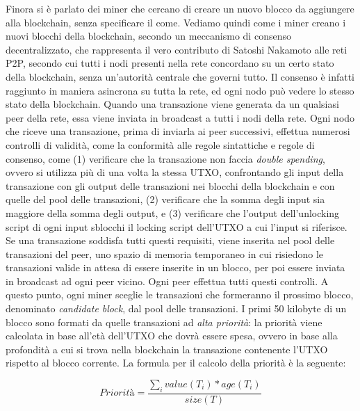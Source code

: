 Finora si è parlato dei miner che cercano di creare un nuovo blocco da aggiungere alla blockchain, senza specificare il come. Vediamo quindi come i miner creano i nuovi blocchi della blockchain, secondo un meccanismo di consenso decentralizzato, che rappresenta il vero contributo di Satoshi Nakamoto alle reti P2P, secondo cui tutti i nodi presenti nella rete concordano su un certo stato della blockchain, senza un'autorità centrale che governi tutto. Il consenso è infatti raggiunto in maniera asincrona su tutta la rete, ed ogni nodo può vedere lo stesso stato della blockchain.
Quando una transazione viene generata da un qualsiasi peer della rete, essa viene inviata in broadcast a tutti i nodi della rete. Ogni nodo che riceve una transazione, prima di inviarla ai peer successivi, effettua numerosi controlli di validità, come la conformità alle regole sintattiche e regole di consenso, come (1) verificare che la transazione non faccia \emph{double spending}, ovvero si utilizza più di una volta la stessa UTXO, confrontando gli input della transazione con gli output delle transazioni nei blocchi della blockchain e con quelle del pool delle transazioni, (2) verificare che la somma degli input sia maggiore della somma degli output, e (3) verificare che l'output dell'unlocking script di ogni input sblocchi il locking script dell'UTXO a cui l'input si riferisce. Se una transazione soddisfa tutti questi requisiti, viene inserita nel pool delle transazioni del peer, uno spazio di memoria temporaneo in cui risiedono le transazioni valide in attesa di essere inserite in un blocco, per poi essere inviata in broadcast ad ogni peer vicino. Ogni peer effettua tutti questi controlli. A questo punto, ogni miner sceglie le transazioni che formeranno il prossimo blocco, denominato \emph{candidate block}, dal pool delle transazioni. I primi 50 kilobyte di un blocco sono formati da quelle transazioni ad \emph{alta priorità}: la priorità viene calcolata in base all'età dell'UTXO che dovrà essere spesa, ovvero in base alla profondità a cui si trova nella blockchain la transazione contenente l'UTXO rispetto al blocco corrente. La formula per il calcolo della priorità è la seguente:

\begin{equation*}
	Priorità = \frac{\sum_i  value(T_i) * age(T_i)}{size(T)}
\end{equation*}

